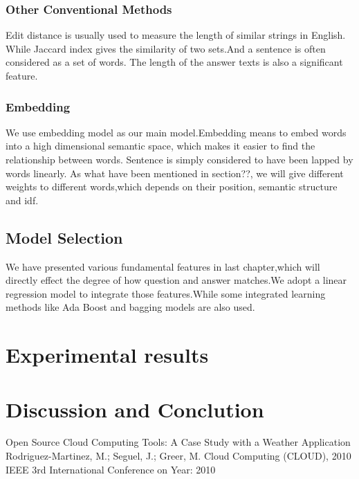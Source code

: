 \documentclass{llncs}
\begin{document}
\subsubsection{Other Conventional Methods}
Edit distance is usually used to measure the length of similar strings in English. While Jaccard index gives the similarity of two sets.And a sentence is often considered as a set of words.
The length of the answer texts is also a significant feature.


\subsubsection{Embedding}
We use embedding model as our main model.Embedding means to embed words into a high dimensional semantic space, which makes it easier to find the relationship between words. Sentence is simply considered to have been lapped by words linearly. As what have been mentioned in section??, we will give different weights to different words,which depends on their position, semantic structure and idf.


\subsection{Model Selection}
We have presented various fundamental features in last chapter,which will directly effect the degree of how question and answer matches.We adopt a linear regression model to integrate those features.While some integrated learning methods like Ada Boost and bagging models are also used. 



\section{Experimental results}




\section{Discussion and Conclution}








%
%
\begin{thebibliography}{}
%
Open Source Cloud Computing Tools: A Case Study with a Weather Application
Rodriguez-Martinez, M.; Seguel, J.; Greer, M.
Cloud Computing (CLOUD), 2010 IEEE 3rd International Conference on
Year: 2010
% 
% 

\end{thebibliography}
\end{document}
